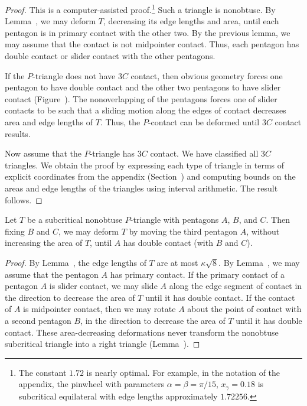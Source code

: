\begin{proof} This is a computer-assisted proof.\footnote{The constant
    $1.72$ is nearly optimal.  For example, in the notation of the
    appendix, the pinwheel with parameters $\alpha=\beta=\pi/15$,
    $x_\gamma = 0.18$ is subcritical equilateral with edge lengths
    approximately $1.72256$.} Such a triangle is nonobtuse.  By
  Lemma~, we may deform $T$, decreasing its
  edge lengths and area, until each pentagon is in primary contact
  with the other two.  By the previous lemma, we may assume that the
  contact is not midpointer contact.  Thus, each pentagon has double
  contact or slider contact with the other pentagons.

  If the $P$-triangle does not have $3C$ contact, then obvious
  geometry forces one pentagon to have double contact and the other
  two pentagons to have slider contact (Figure~).
  The nonoverlapping of the pentagons forces one of slider contacts to
  be such that a sliding motion along the edges of contact decreases
  area and edge lengths of $T$.  Thus, the $P$-contact can be deformed
  until $3C$ contact results.



Now assume that the $P$-triangle has $3C$ contact.  We have classified
all $3C$ triangles.  We obtain the proof by expressing each type of
triangle in terms of explicit coordinates from the appendix
(Section~) and computing bounds on the areas and
edge lengths of the triangles using interval arithmetic.  The result
follows.
\end{proof}

\begin{lemma} 
  Let $T$ be a subcritical nonobtuse $P$-triangle with pentagons $A$,
  $B$, and $C$.  Then fixing $B$ and $C$, we may deform $T$ by moving
  the third pentagon $A$, without increasing the area of $T$, until
  $A$ has double contact (with $B$ and $C$).
\end{lemma}

\begin{proof}
  By Lemma~, the edge lengths of $T$ are at most
  $\kappa\sqrt8$.  By Lemma~, we may assume that
  the pentagon $A$ has primary contact.  If the primary contact of a
  pentagon $A$ is slider contact, we may slide $A$ along the edge
  segment of contact in the direction to decrease the area of $T$
  until it has double contact.  If the contact of $A$ is midpointer
  contact, then we may rotate $A$ about the point of contact with a
  second pentagon $B$, in the direction to decrease the area of $T$
  until it has double contact.  These area-decreasing deformations
  never transform the nonobtuse subcritical triangle into a right
  triangle (Lemma~).
\end{proof}


